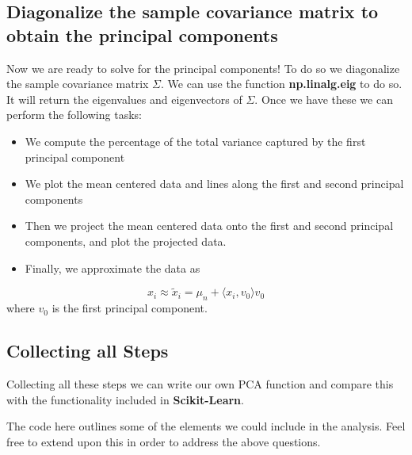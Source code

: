 \documentclass[%
oneside,                 %
final,                   %
10pt]{article}
\begin{document}
\subsection{Diagonalize the sample covariance matrix to obtain the principal components}

Now we are ready to solve for the principal components! To do so we
diagonalize the sample covariance matrix $\Sigma$. We can use the
function \textbf{np.linalg.eig} to do so. It will return the eigenvalues and
eigenvectors of $\Sigma$. Once we have these we can perform the 
following tasks:

\begin{itemize}
\item We compute the percentage of the total variance captured by the first principal component

\item We plot the mean centered data and lines along the first and second principal components

\item Then we project the mean centered data onto the first and second principal components, and plot the projected data. 

\item Finally, we approximate the data as
\end{itemize}

\noindent
\begin{equation*}
x_i \approx \tilde{x}_i = \mu_n + \langle x_i, v_0 \rangle v_0
\end{equation*}
where $v_0$ is the first principal component. 

\subsection{Collecting all Steps}

Collecting all these steps we can write our own PCA function and
compare this with the functionality included in \textbf{Scikit-Learn}.  

The code here outlines some of the elements we could include in the
analysis. Feel free to extend upon this in order to address the above
questions.
\end{document}
